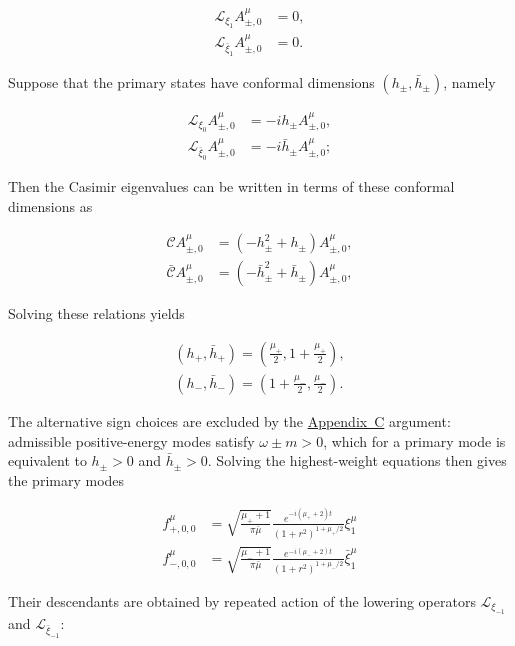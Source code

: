  \begin{align}
\mathcal{L}_{\xi _{1}} A_{\pm,0}^\mu & = 0, \\
\mathcal{L}_{\bar{\xi}_{1}} A_{\pm,0}^\mu & = 0.
\end{align}

Suppose that the primary states have conformal dimensions $(h_{\pm}, \bar{h}_{\pm})$, namely

 \begin{align}
\mathcal{L}_{\xi _{0}}A_{\pm,0}^{\mu} & =-ih_{\pm}A_{\pm,0}^{\mu}, \\
\mathcal{L}_{\bar{\xi}_{0}}A_{\pm,0}^{\mu} & =-i\bar{h}_{\pm}A_{\pm,0}^{\mu};
\end{align}

Then the Casimir eigenvalues can be written in terms of these conformal dimensions as

 \begin{align}
\mathcal{C}A_{\pm,0}^{\mu} & =(-h_{\pm}^{2}+h_{\pm})A_{\pm,0}^{\mu}, \\
\mathcal{\bar{C}}A_{\pm,0}^{\mu} & =(-\bar{h}_{\pm}^{2}+\bar{h}_{\pm})A_{\pm,0}^{\mu},
\end{align}

Solving these relations yields

 \begin{align}
(h_{+},\bar{h}_{+})=\left(\frac{\mu _{+}}{2},1+\frac{\mu _{+}}{2}\right), \\
(h_{-},\bar{h}_{-})=\left(1+\frac{\mu _{-}}{2},\frac{\mu _{-}}{2}\right).
\end{align}

The alternative sign choices are excluded by the \hyperref[app:symplectic-positivity]{Appendix~C} argument: admissible positive-energy modes satisfy $\omega \pm m > 0$, which for a primary mode is equivalent to $h_{\pm} > 0$ and $\bar{h}_{\pm} > 0$. Solving the highest-weight equations then gives the primary modes

 \begin{align}
f_{+,0,0}^{\mu} & =\sqrt{ \frac{\mu _{+}+1}{\pi \bar{\mu}} }\frac{e^{-i(\mu _{+}+2)t}}{(1+r^{2})^{1+\mu _{+}/2}}\xi _{1}^{\mu} \\
f_{-,0,0}^{\mu} & =\sqrt{ \frac{\mu _{-}+1}{\pi \bar{\mu}} }\frac{e^{-i(\mu _{-}+2)t}}{(1+r^{2})^{1+\mu _{-}/2}}\bar{\xi}_{1}^{\mu}
\end{align}

Their descendants are obtained by repeated action of the lowering operators $\mathcal{L}_{\xi _{-1}}$ and $\mathcal{L}_{\bar{\xi}_{-1}}$:

